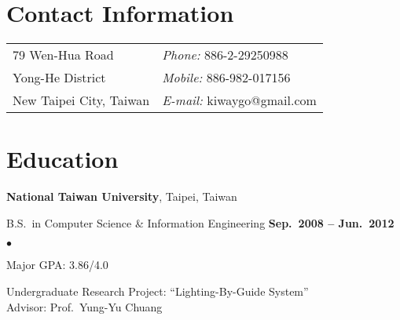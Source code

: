 \documentclass[margin,line, 11pt, a4paper]{res}
\newenvironment{list1}{
  \begin{list}{}{%
      \setlength{\itemsep}{.1in}
      \setlength{\parsep}{0in} \setlength{\parskip}{0in}
      \setlength{\topsep}{.07in} \setlength{\partopsep}{0in} 
      \setlength{\leftmargin}{0.17in}}}{\end{list}}
\newenvironment{list2}{
  \begin{list}{$\bullet$}{%
      \setlength{\itemsep}{.02in}
      \setlength{\parsep}{0in} \setlength{\parskip}{0in}
      \setlength{\topsep}{.05in} \setlength{\partopsep}{0in} 
      \setlength{\leftmargin}{0.2in}}}{\end{list}}
\begin{document}
\pagestyle{empty}


\begin{resume}
\section{\sc Contact Information}
\vspace{.05in}
\begin{tabular}{p{3.3in}p{2.1in}}
79 Wen-Hua Road & {\it Phone:} 886-2-29250988\\
Yong-He District & {\it Mobile:} 886-982-017156\\
New Taipei City, Taiwan & {\it E-mail:} kiwaygo@gmail.com\\
\end{tabular}

%

\section{\sc Education}
{\bf National Taiwan University}, Taipei, Taiwan

\begin{list1}
\item B.S.~in Computer Science \& Information Engineering \hfill {\bf Sep.~2008 -- Jun.~2012}

\begin{list2}
{\small \item Major GPA: 3.86/4.0
\item Undergraduate Research Project: ``Lighting-By-Guide System''\\Advisor: Prof.~Yung-Yu Chuang}
\end{list2}


\end{list1}
\end{resume}
\end{document}
